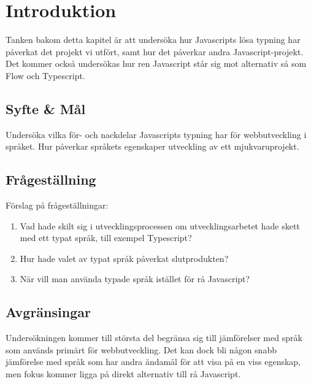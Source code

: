 \section{Introduktion}
\label{sec:alexander-introduction}
Tanken bakom detta kapitel är att undersöka hur Javascripts lösa typning har påverkat det projekt vi utfört, samt hur det påverkar andra Javascript-projekt. Det kommer också undersökas hur ren Javascript står sig mot alternativ så som Flow och Typescript.

\subsection{Syfte \& Mål}
\label{subsec:motivation}

Undersöka vilka för- och nackdelar Javascripts typning har för webbutveckling i språket. Hur påverkar språkets egenskaper utveckling av ett mjukvaruprojekt.

\subsection{Frågeställning}
\label{subsec:research-questions}

Förslag på frågeställningar:

\begin{enumerate}
\item Vad hade skilt sig i utvecklingsprocessen om utvecklingsarbetet hade skett med ett typat språk, till exempel Typescript?

\item Hur hade valet av typat språk påverkat slutprodukten?

\item När vill man använda typade språk istället för rå Javascript?

\end{enumerate}


\subsection{Avgränsingar}
\label{subsec:delimitations}

Undersökningen kommer till största del begränsa sig till jämförelser med språk som används primärt för webbutveckling. Det kan dock bli någon snabb jämförelse med språk som har andra ändamål för att visa på en viss egenskap, men fokus kommer ligga på direkt alternativ till rå Javascript.




